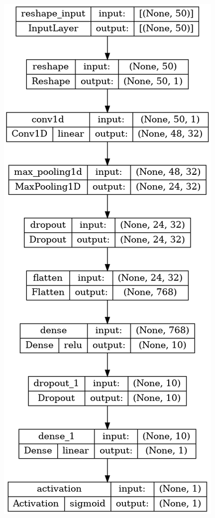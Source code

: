 \begin{figure}[!ht]
    \centering
    \begin{minipage}{0.5\textwidth}
        \centering
        \includegraphics[width=\linewidth]{obrazky-figures/model-plots/Tabular_CNN.png} %

\end{minipage}
\end{figure}
